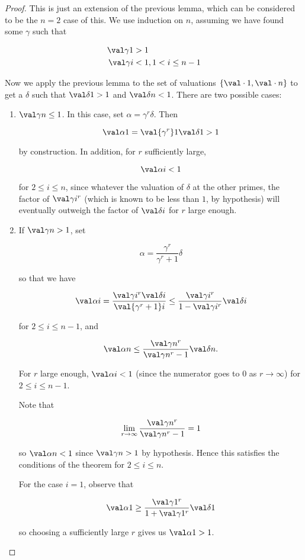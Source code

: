 \begin{proof}
  This is just an extension of the previous lemma, which can be considered to be
  the $n=2$ case of this. We use induction on $n$, assuming we have found some
  $\gamma$ such that

  \begin{align*}
    \val \gamma 1 &> 1\\
    \val \gamma i &< 1, 1 < i \leq n - 1
  \end{align*}

  Now we apply the previous lemma to the set of valuations $\{ \val \cdot 1,
  \val \cdot n \}$ to get a $\delta$ such that $\val \delta 1 > 1$ and $\val
  \delta n < 1$. There are two possible cases:
  \begin{enumerate}
  \item $\val \gamma n \leq 1$. In this case, set $\alpha = \gamma^r \delta$.
    Then

    \[ \val \alpha 1 = \val {\gamma^r} 1 \val \delta 1 > 1 \]

    by construction. In addition, for $r$ sufficiently large,

    \[ \val \alpha i < 1 \]

    for $2\leq i \leq n$, since whatever the valuation of $\delta$ at the other
    primes, the factor of $\val \gamma i ^r$ (which is known to be less than
    $1$, by hypothesis) will eventually outweigh the factor of $\val \delta i$
    for $r$ large enough.

  \item If $\val \gamma n > 1$, set

    \[ \alpha = \frac{\gamma^r}{\gamma^r + 1} \delta \]

    so that we have

    \[ \val \alpha i = \frac{\val \gamma i ^r \val \delta i}{\val {\gamma^r + 1}
        i} \leq \frac {\val \gamma i ^r} {1 - \val \gamma i ^r} \val \delta i
    \]

    for $2 \leq i \leq n - 1$, and

    \[
      \val \alpha n \leq \frac{\val \gamma n ^r} {\val \gamma n ^r - 1} \val
      \delta n.
    \]

    For $r$ large enough, $\val \alpha i < 1$ (since the numerator goes to $0$
    as $r\to\infty$) for $2\leq i\leq n-1$.

    Note that

    \[ \lim_{r\to\infty} \frac{\val \gamma n ^r} {\val \gamma n ^r - 1} = 1 \]

    so $\val \alpha n < 1$ since $\val \gamma n > 1$ by hypothesis. Hence this
    satisfies the conditions of the theorem for $2\leq i \leq n$.

    For the case $i = 1$, observe that

    \[ \val \alpha 1 \geq \frac {\val \gamma 1 ^r} {1 + \val \gamma 1 ^r} \val
      \delta 1 \]

    so choosing a sufficiently large $r$ gives us $\val \alpha 1 > 1$.

  \end{enumerate}
\end{proof}

